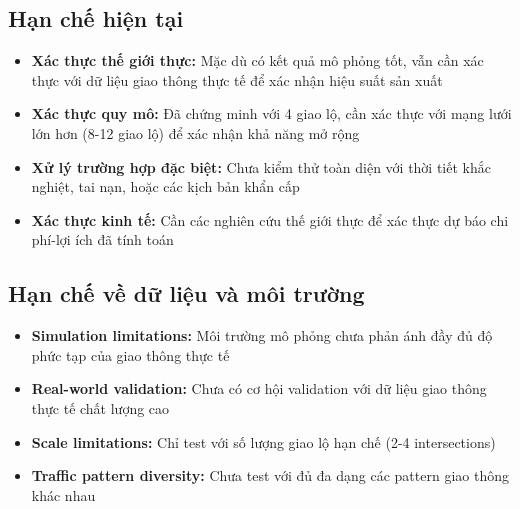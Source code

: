\subsection{Hạn chế hiện tại}
\begin{itemize}
    \item         \textbf{Xác thực thế giới thực:} Mặc dù có kết quả mô phỏng tốt, vẫn cần
        xác thực với dữ liệu giao thông thực tế để xác nhận hiệu suất sản xuất

    \item \textbf{Xác thực quy mô:} Đã chứng minh với 4 giao lộ, cần xác thực
        với mạng lưới lớn hơn (8-12 giao lộ) để xác nhận khả năng mở rộng

    \item \textbf{Xử lý trường hợp đặc biệt:} Chưa kiểm thử toàn diện với thời tiết khắc nghiệt,
        tai nạn, hoặc các kịch bản khẩn cấp

    \item \textbf{Xác thực kinh tế:} Cần các nghiên cứu thế giới thực để xác thực
        dự báo chi phí-lợi ích đã tính toán
\end{itemize}

\subsection{Hạn chế về dữ liệu và môi trường}
\begin{itemize}
    \item \textbf{Simulation limitations:} Môi trường mô phỏng chưa phản ánh đầy
        đủ độ phức tạp của giao thông thực tế

    \item \textbf{Real-world validation:} Chưa có cơ hội validation với dữ liệu
        giao thông thực tế chất lượng cao

    \item \textbf{Scale limitations:} Chỉ test với số lượng giao lộ hạn chế (2-4
        intersections)

    \item \textbf{Traffic pattern diversity:} Chưa test với đủ đa dạng các
        pattern giao thông khác nhau
\end{itemize}

